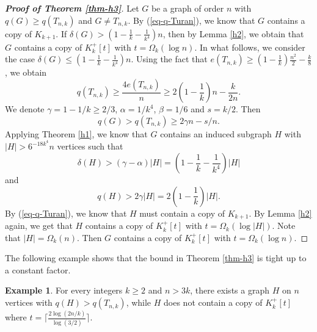 \documentclass[11pt,a4paper]{article}
\theoremstyle{plain}
\theoremstyle{definition}
\newtheorem{example}{Example}[section]
\begin{document}
\begin{proof}[{\bf Proof of Theorem \ref{thm-h3}}]
Let $G$ be a graph of order $n$ with  $q(G)\ge q( T_{n,k})$ and $G\neq T_{n,k}$. 
By (\ref{eq-q-Turan}), we know that $G$ contains a copy of $K_{k+1}$. If $\delta(G)>(1- 
\frac{1}{k} - \frac{1}{k^{4}})n$, 
then by Lemma \ref{h2}, we obtain that $G$ contains a copy of $K_{k}^{+}[t]$ with $t=\Omega_k(\log n)$. 
In what follows, we consider the case 
$\delta(G)\leq (1- \frac{1}{k} - \frac{1}{k^4})n$. 
 Using the fact that
$e( T_{n,k})\geq(1- \frac{1}{k})\frac{n^{2}}{2} - \frac{k}{8}$, we obtain 
\[  q(T_{n,k})\ge \frac{4e(T_{n,k})}{n}
\ge 2\left(1- \frac{1}{k} \right)n- \frac{k}{2n}. \] 
We denote $\gamma=1-1/k\geq 2/3$, $\alpha=1/k^{4}$, $\beta=1/6$ and $s=k/2$. 
Then 
$$q(G)>q( T_{n,k})\ge 2\gamma n-s/n.$$ 
Applying Theorem \ref{h1}, we know that $G$ contains an induced subgraph $H$ with  $|H|>6^{-18k^{4}} n$ vertices such that   
\[ \delta(H)>(\gamma-\alpha)|H| = 
\left(1- \frac{1}{k} - \frac{1}{k^4} \right)|H| \] 
and 
\[ q(H)>2\gamma |H|=2\left(1- \frac{1}{k}\right)|H|. \]  
By (\ref{eq-q-Turan}),  
we know that $H$ must contain a copy of $K_{k+1}$. 
By Lemma \ref{h2} again, we get that $H$ contains a copy of 
$K_{k}^{+}[t]$ with $t=\Omega_k( \log |H|)$.  Note that $|H|= \Omega_k(n)$. Then 
$G$ contains a copy of $K_k^+[t]$ with $t=\Omega_k (\log n)$. 
\end{proof}

The following example shows that 
the bound in Theorem \ref{thm-h3} is tight up to a constant factor. 

\begin{example} \label{exam-2-6}
For every integers $k\ge 2$ and $n>3k$, 
    there exists a graph $H$ on $n$ vertices 
with $q(H)> q(T_{n,k})$, while  
$H$ does not contain a copy of $K_{k}^+[t]$ where $t= \big\lceil\frac{2\log (2n/k)}{\log (3/2)} \big\rceil$.  
\end{example}
\end{document}
